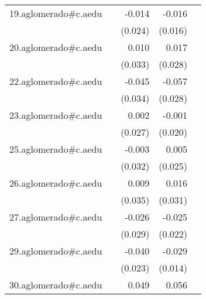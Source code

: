 {\begin{longtable}{l*{4}{D{.}{.}{-1}}}
\addlinespace
19.aglomerado#c.aedu&                     &      -0.014         &      -0.016         &                     \\
            &                     &     (0.024)         &     (0.016)         &                     \\
\addlinespace
20.aglomerado#c.aedu&                     &       0.010         &       0.017         &                     \\
            &                     &     (0.033)         &     (0.028)         &                     \\
\addlinespace
22.aglomerado#c.aedu&                     &      -0.045         &      -0.057\sym{*}  &                     \\
            &                     &     (0.034)         &     (0.028)         &                     \\
\addlinespace
23.aglomerado#c.aedu&                     &       0.002         &      -0.001         &                     \\
            &                     &     (0.027)         &     (0.020)         &                     \\
\addlinespace
25.aglomerado#c.aedu&                     &      -0.003         &       0.005         &                     \\
            &                     &     (0.032)         &     (0.025)         &                     \\
\addlinespace
26.aglomerado#c.aedu&                     &       0.009         &       0.016         &                     \\
            &                     &     (0.035)         &     (0.031)         &                     \\
\addlinespace
27.aglomerado#c.aedu&                     &      -0.026         &      -0.025         &                     \\
            &                     &     (0.029)         &     (0.022)         &                     \\
\addlinespace
29.aglomerado#c.aedu&                     &      -0.040         &      -0.029\sym{*}  &                     \\
            &                     &     (0.023)         &     (0.014)         &                     \\
\addlinespace
30.aglomerado#c.aedu&                     &       0.049         &       0.056\sym{*}  &                     \\

\end{longtable}}
